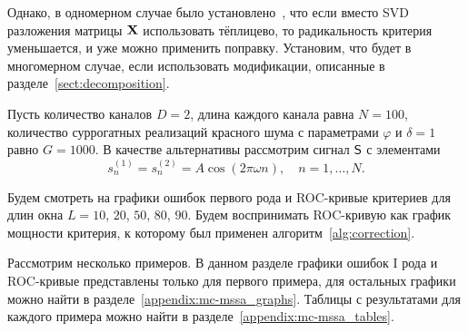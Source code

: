 \documentclass[specialist,
substylefile = spbu_report.rtx,
subf,href,colorlinks=true, 12pt]{disser}
\theoremstyle{definition}
\begin{document}
Однако, в одномерном случае было установлено~\cite{Larin_2022}, что если вместо SVD разложения матрицы $\mathbf{X}$ использовать тёплицево, то радикальность критерия уменьшается, и уже можно применить поправку. Установим, что будет в многомерном случае, если использовать модификации, описанные в разделе~\ref{sect:decomposition}.

Пусть количество каналов $D=2$, длина каждого канала равна $N=100$, количество суррогатных реализаций красного шума с параметрами $\varphi$ и $\delta=1$ равно $G=1000$. В качестве альтернативы рассмотрим сигнал $\mathsf{S}$ с элементами
\[
s_n^{(1)}=s_n^{(2)}=A\cos(2\pi\omega n),\quad n=1,\ldots, N.
\]

Будем смотреть на графики ошибок первого рода и ROC-кривые критериев для длин окна $L=10$, $20$, $50$, $80$, $90$. Будем воспринимать ROC-кривую как график мощности критерия, к которому был применен алгоритм~\ref{alg:correction}.

Рассмотрим несколько примеров. В данном разделе графики ошибок I рода и ROC-кривые представлены только для первого примера, для остальных графики можно найти в разделе~\ref{appendix:mc-mssa_graphs}. Таблицы с результатами для каждого примера можно найти в разделе~\ref{appendix:mc-mssa_tables}.
\end{document}
